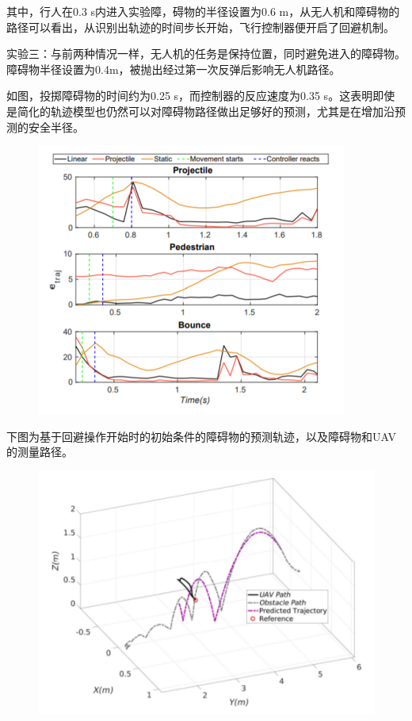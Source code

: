 \documentclass{article}
\begin{document}
其中，行人在0.3 s内进入实验障，碍物的半径设置为0.6 m，从无人机和障碍物的路径可以看出，从识别出轨迹的时间步长开始，飞行控制器便开启了回避机制。\par
实验三：与前两种情况一样，无人机的任务是保持位置，同时避免进入的障碍物。障碍物半径设置为0.4m，被抛出经过第一次反弹后影响无人机路径。\par
如图，投掷障碍物的时间约为0.25 s，而控制器的反应速度为0.35 s。这表明即使是简化的轨迹模型也仍然可以对障碍物路径做出足够好的预测，尤其是在增加沿预测的安全半径。\par

\par
\begin{figure}[h!]
\centering
\includegraphics[scale=0.5]{5}
\label{fig:5}
\end{figure}

下图为基于回避操作开始时的初始条件的障碍物的预测轨迹，以及障碍物和UAV的测量路径。\par

\par
\begin{figure}[h!]
\centering
\includegraphics[scale=0.5]{6}
\label{fig:6}
\end{figure}
\end{document}
